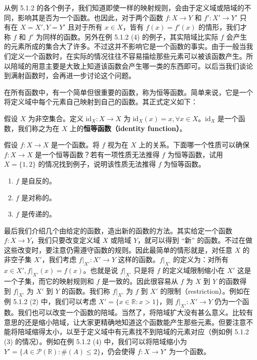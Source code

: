 \begin{example}
\begin{enumerate}
\end{enumerate}
\end{example}

从例 5.1.2 的各个例子，我们知道即使一样的映射规则，会由于定义域或陪域的不同，影响其是否为一个函数。也因此，对于两个函数 $f : X \to Y$ 和 $f' : X' \to Y'$ 只有在 $X = X', Y = Y'$ 且对于所有 $x \in X$，皆有 $f(x) = f'(x)$ 的情形，我们才称 $f$ 和 $f'$ 为同样的函数。另外在例 5.1.2 (4) 的例子，其实陪域比实际 $f$ 会产生的元素所成的集合大了许多。不过这并不影响它是一个函数的事实。由于一般当我们定义一个函数时，在实际的情况往往不容易描绘那些元素可以被该函数产生。所以陪域的用意主要是大致上知道该函数会产生哪一类的东西即可。以后当我们谈论到满射函数时，会再进一步讨论这个问题。

在所有函数中，有一个简单但很重要的函数，称为恒等函数。简单来说，它是一个将定义域中每个元素自己映射到自己的函数。其正式定义如下：

\begin{definition}
假设 $X$ 为非空集合。定义 $\mathrm{id}_X : X \to X$ 为 $\mathrm{id}_X(x) = x, \forall x \in X$。$\mathrm{id}_X$ 是一个函数，我们称之为在 $X$ 上的{\bf 恒等函数（identity function）}。
\end{definition}

\begin{question}
假设 $f : X \to X$ 是一个函数。将 $f$ 视为在 $X$ 上的关系。下面哪一个性质可以确保 $f : X \to X$ 是一个恒等函数？若有一项性质无法推得 $f$ 为恒等函数，试用 $X = \{1, 2\}$ 的情况找到例子，说明该性质无法推得 $f$ 为恒等函数。
\begin{enumerate}
    \item $f$ 是自反的。
    \item $f$ 是对称的。
    \item $f$ 是传递的。
\end{enumerate}
\end{question}

最后我们介绍几个由给定的函数，造出新的函数的方法。其实给定一个函数 $f : X \to Y$，我们只要改变定义域 $X$ 或陪域 $Y$，就可以得到 “新” 的函数。不过在做这些改变时，要注意仍需遵守函数的规则。因此最简单的情形就是，对任意 $X$ 的非空子集 $X'$，我们考虑 $f|_{X'} : X' \to Y$ 这样的函数。$f|_{X'}$ 的定义为：对所有 $x \in X', f|_{X'}(x) = f(x)$。也就是说 $f|_{X'}$ 只是将 $f$ 的定义域限制缩小在 $X'$ 这是一个子集，而它的映射规则和 $f$ 是一致的。因此很容易从 $f$ 为 $X$ 到 $Y$ 的函数得到 $f|_{X'}$ 为 $X'$ 到 $Y$ 的函数。我们称 $f|_{X'}$ 为 $f$ 到 $X'$ 的限制（restriction）。例如在例 5.1.2 (2) 中，我们可以考虑 $X' = \{x \in \mathbb{R} : x > 1\}$，则 $f|_{X'} : X' \to Y$ 仍为一个函数。我们也可以改变一个函数的陪域。当然了，将陪域扩大没有甚么意义。比较有意思的还是缩小陪域，让大家更精确地知道这个函数能产生那些元素。但要注意不能将陪域缩得太小，以至于定义域中有元素找不到陪域的元素对应（例如例 5.1.2 (3) 的情况）。例如在例 5.1.2 (4) 中，我们可以将陪域缩小为 $Y' = \{A \in \mathcal{P}(\mathbb{R}) : \#(A) \leq 2\}$，仍会使得 $f : X \to Y'$ 为一个函数。

